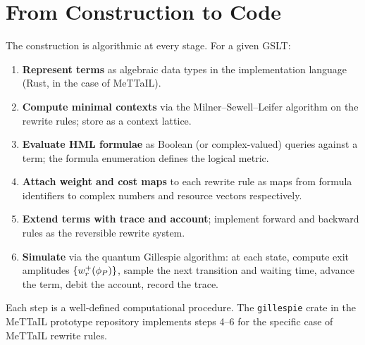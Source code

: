 \section{From Construction to Code}

The construction is algorithmic at every stage.  For a given GSLT:

\begin{enumerate}[itemsep=4pt]
  \item \textbf{Represent terms} as algebraic data types in the implementation
        language (Rust, in the case of MeTTaIL).

  \item \textbf{Compute minimal contexts} via the Milner--Sewell--Leifer
        algorithm on the rewrite rules; store as a context lattice.

  \item \textbf{Evaluate HML formulae} as Boolean (or complex-valued) queries
        against a term; the formula enumeration defines the logical metric.

  \item \textbf{Attach weight and cost maps} to each rewrite rule as maps from
        formula identifiers to complex numbers and resource vectors respectively.

  \item \textbf{Extend terms with trace and account}; implement forward and
        backward rules as the reversible rewrite system.

  \item \textbf{Simulate} via the quantum Gillespie algorithm: at each state,
        compute exit amplitudes $\{w^{+}_r(\phi_P)\}$, sample the next transition
        and waiting time, advance the term, debit the account, record the trace.
\end{enumerate}

Each step is a well-defined computational procedure.  The \texttt{gillespie}
crate in the MeTTaIL prototype repository implements steps 4--6 for the
specific case of MeTTaIL rewrite rules.

